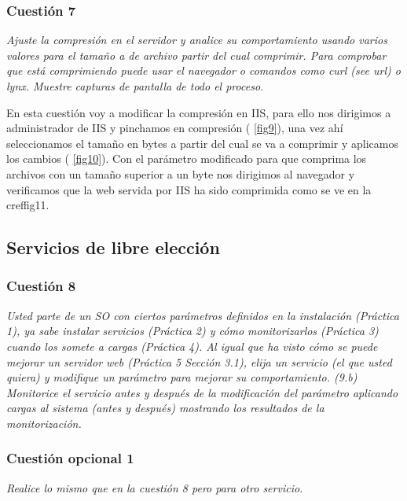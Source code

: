 \subsubsection{Cuestión 7}
\textit{Ajuste la compresión en el servidor y analice su
comportamiento usando varios valores para el tamaño a de archivo partir del cual comprimir. Para comprobar que está comprimiendo puede usar el navegador o comandos como curl (see url) o lynx. Muestre capturas de pantalla de todo el proceso.}

En esta cuestión voy a modificar la compresión en IIS, para ello nos dirigimos a administrador de IIS y pinchamos en compresión ( \cref{fig9}), una vez ahí seleccionamos el tamaño en bytes a partir del cual se va a comprimir y aplicamos los cambios ( \cref{fig10}). Con el parámetro modificado para que comprima los archivos con un tamaño superior a un byte nos dirigimos al navegador y verificamos que la web servida por IIS ha sido comprimida como se ve en la \\cref{fig11}.

\subsection{Servicios de libre elección}
\subsubsection{Cuestión 8}
\textit{Usted parte de un SO con ciertos parámetros definidos en la instalación (Práctica 1), ya sabe instalar servicios (Práctica 2) y cómo monitorizarlos (Práctica 3) cuando los somete a cargas (Práctica 4). Al igual que ha visto cómo se puede mejorar un servidor web (Práctica 5 Sección 3.1), elija un servicio (el que usted quiera) y modifique un parámetro para mejorar su comportamiento. (9.b) Monitorice el servicio antes y después de la modificación del parámetro aplicando cargas al sistema (antes y después) mostrando los resultados de la monitorización.}
\subsubsection{Cuestión opcional 1}
\textit{Realice lo mismo que en la cuestión 8 pero para otro servicio.}
\newpage




